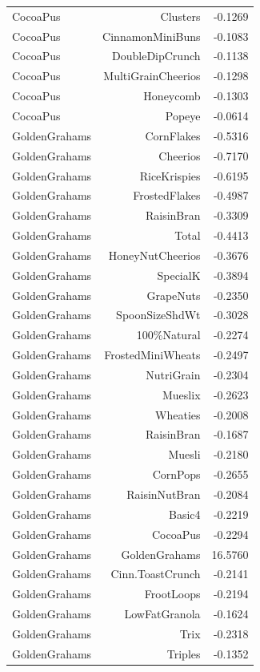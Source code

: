 \begin{longtable}{@{}lrr@{}}
CocoaPus & Clusters & -0.1269 \\
CocoaPus & CinnamonMiniBuns & -0.1083 \\
CocoaPus & DoubleDipCrunch & -0.1138 \\
CocoaPus & MultiGrainCheerios & -0.1298 \\
CocoaPus & Honeycomb & -0.1303 \\
CocoaPus & Popeye & -0.0614 \\
GoldenGrahams & CornFlakes & -0.5316 \\
GoldenGrahams & Cheerios & -0.7170 \\
GoldenGrahams & RiceKrispies & -0.6195 \\
GoldenGrahams & FrostedFlakes & -0.4987 \\
GoldenGrahams & RaisinBran & -0.3309 \\
GoldenGrahams & Total & -0.4413 \\
GoldenGrahams & HoneyNutCheerios & -0.3676 \\
GoldenGrahams & SpecialK & -0.3894 \\
GoldenGrahams & GrapeNuts & -0.2350 \\
GoldenGrahams & SpoonSizeShdWt & -0.3028 \\
GoldenGrahams & 100\%Natural & -0.2274 \\
GoldenGrahams & FrostedMiniWheats & -0.2497 \\
GoldenGrahams & NutriGrain & -0.2304 \\
GoldenGrahams & Mueslix & -0.2623 \\
GoldenGrahams & Wheaties & -0.2008 \\
GoldenGrahams & RaisinBran & -0.1687 \\
GoldenGrahams & Muesli & -0.2180 \\
GoldenGrahams & CornPops & -0.2655 \\
GoldenGrahams & RaisinNutBran & -0.2084 \\
GoldenGrahams & Basic4 & -0.2219 \\
GoldenGrahams & CocoaPus & -0.2294 \\
GoldenGrahams & GoldenGrahams & 16.5760 \\
GoldenGrahams & Cinn.ToastCrunch & -0.2141 \\
GoldenGrahams & FrootLoops & -0.2194 \\
GoldenGrahams & LowFatGranola & -0.1624 \\
GoldenGrahams & Trix & -0.2318 \\
GoldenGrahams & Triples & -0.1352 \\

\end{longtable}
